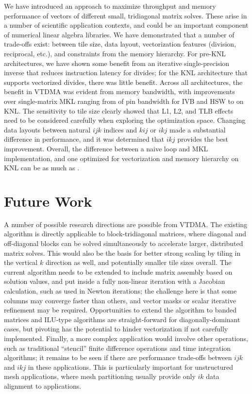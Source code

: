 \documentclass{sig-alternate-05-2015}
\begin{document}
We have introduced an approach to maximize throughput and memory
  performance of vectors of different small, tridiagonal matrix solves.
These arise in a number of scientific application contexts, and could
  be an important component of numerical linear algebra libraries.
We have demonstrated that a number of trade-offs exist: between tile size,
  data layout, vectorization features (division, reciprocal, etc.),
  and constraints from the memory hierarchy.
For pre-KNL architectures, we have shown some benefit from an iterative
  single-precision inverse that reduces instruction latency for divides; 
  for the KNL architecture that supports vectorized divides, 
  there was little benefit.
Across all architectures, the benefit in VTDMA was evident from 
  memory bandwidth, with improvements over single-matrix MKL ranging 
  from  of pin bandwidth for IVB and HSW to 
   on KNL.
The sensitivity to tile size clearly showed that L1, L2, and TLB effects
  need to be considered carefully when exploring the optimization space.
Changing data layouts between natural \(ijk\) indices and \(kij\) 
  or \(ikj\) made a substantial difference in performance, 
  and it was determined that \(ikj\) provides the best 
   improvement.
Overall, the difference between a naive loop and MKL implementation,
  and one optimized for vectorization and memory hierarchy on KNL 
  can be as much as .

\section{Future Work}
\label{sec:future_work}

A number of possible research directions are possible from VTDMA.
The existing algorithm is directly applicable to block-tridiagonal matrices,
  where diagonal and off-diagonal blocks can be solved simultaneously
  to accelerate larger, distributed matrix solves.
This would also be the basis for better strong scaling by tiling in
  the vertical $k$ direction as well, and potentially smaller
  tile sizes overall. 
The current algorithm needs to be extended to include matrix assembly
  based on solution values, and put inside a fully non-linear iteration
  with a Jacobian calculation, such as used in Newton iterations;
  the challenge here is that some columns may converge faster than
  others, and vector masks or scalar iterative refinement may be required.
Opportunities to extend the algorithm to banded matrices and ILU-type 
  algorithms are straight-forward for diagonally-dominant cases, but
  pivoting has the potential to hinder vectorization if not carefully
  implemented.
Finally, a more complex application would involve other operations,
  such as traditional ``stencil'' finite difference operations and
  time integration algorithms; it remains to be seen if there are
  performance trade-offs between \(ijk\) and \(ikj\) in 
  these applications.
This is particularly important for unstructured mesh applications,
  where mesh partitioning usually provide only \(ik\) 
  data alignment to applications.
\end{document}
